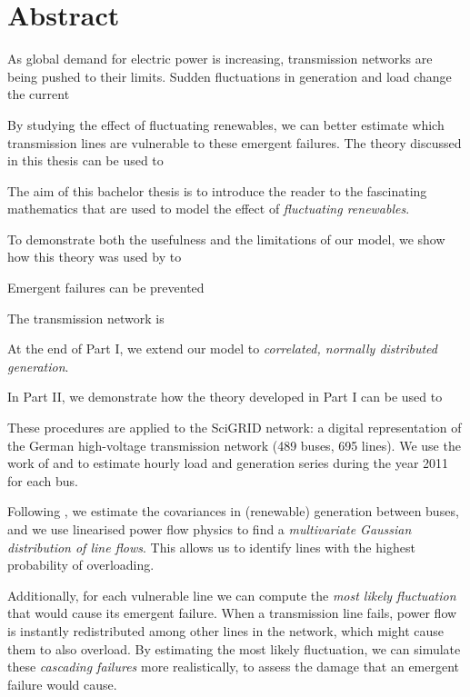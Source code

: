 \documentclass{report}
\title{\thesistitle}
\author{\thesisauthorfirst\space\thesisauthorsecond}
\date{\thesisdate}
\theoremstyle{definition}
\theoremstyle{remark}
\begin{document}


\chapter*{Abstract}


As global demand for electric power is increasing, transmission networks are being pushed to their limits. Sudden fluctuations in generation and load change the current 

By studying the effect of fluctuating renewables, we can better estimate which transmission lines are vulnerable to these emergent failures. The theory discussed in this thesis can be used to 



The aim of this bachelor thesis is to introduce the reader to the fascinating mathematics that are used to model the effect of \emph{fluctuating renewables}. 

To demonstrate both the usefulness and the limitations of our model, we show how this theory was used by \cite{Nesti2018emergentfailures} to 


Emergent failures can be prevented 



The transmission network is 

At the end of Part I, we extend our model to \emph{correlated, normally distributed generation}. 

In Part II, we demonstrate how the theory developed in Part I can be used to 

These procedures are applied to the SciGRID network: a digital representation of the German high-voltage transmission network (489 buses, 695 lines). We use the work of \cite{PyPSA} and  to estimate hourly load and generation series during the year 2011 for each bus. 

Following \cite{Nesti2018emergentfailures}, we estimate the covariances in (renewable) generation between buses, and we use linearised power flow physics to find a \emph{multivariate Gaussian distribution of line flows}. This allows us to identify lines with the highest probability of overloading.

Additionally, for each vulnerable line we can compute the \emph{most likely fluctuation} that would cause its emergent failure. 
When a transmission line fails, power flow is instantly redistributed among other lines in the network, which might cause them to also overload.
By estimating the most likely fluctuation, we can simulate these \emph{cascading failures} more realistically, to assess the damage that an emergent failure would cause.
\end{document}
